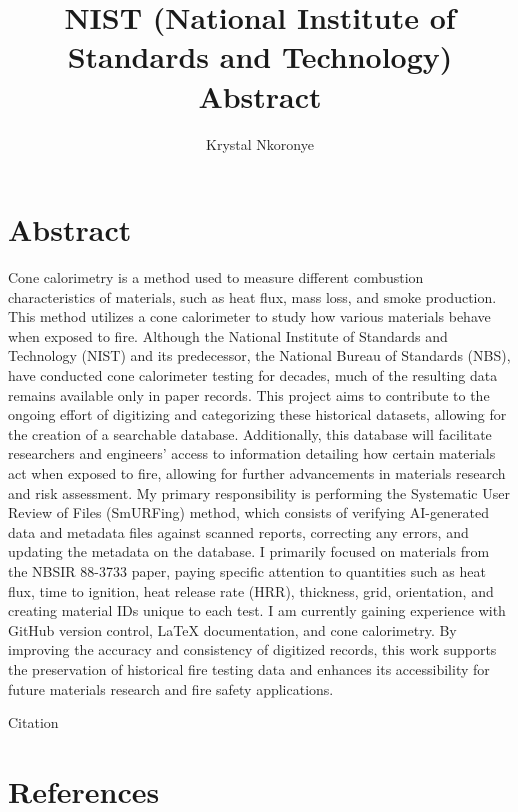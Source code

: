 \documentclass{abstract}
\title{NIST (National Institute of Standards and Technology) Abstract}
\author{Krystal Nkoronye}
\begin{document}
\maketitle
\section{Abstract}
Cone calorimetry is a method used to measure different combustion characteristics of materials, such as heat flux, mass loss, and smoke production. This method utilizes a cone calorimeter to study how various materials behave when exposed to fire. Although the National Institute of Standards and Technology (NIST) and its predecessor, the National Bureau of Standards (NBS), have conducted cone calorimeter testing for decades, much of the resulting data remains available only in paper records. This project aims to contribute to the ongoing effort of digitizing and categorizing these historical datasets, allowing for the creation of a searchable database. Additionally, this database will facilitate researchers and engineers’ access to information detailing how certain materials act when exposed to fire, allowing for further advancements in materials research and risk assessment. My primary responsibility is performing the Systematic User Review of Files (SmURFing) method, which consists of verifying AI-generated data and metadata files against scanned reports, correcting any errors, and updating the metadata on the database. I primarily focused on materials from the NBSIR 88-3733 paper, paying specific attention to quantities such as heat flux, time to ignition, heat release rate (HRR), thickness, grid, orientation, and creating material IDs unique to each test. I am currently gaining experience with GitHub version control, LaTeX documentation, and cone calorimetry. By improving the accuracy and consistency of digitized records, this work supports the preservation of historical fire testing data and enhances its accessibility for future materials research and fire safety applications.



Citation \cite{}


\section{References}
\printbibliography[heading=none]
\end{document}
